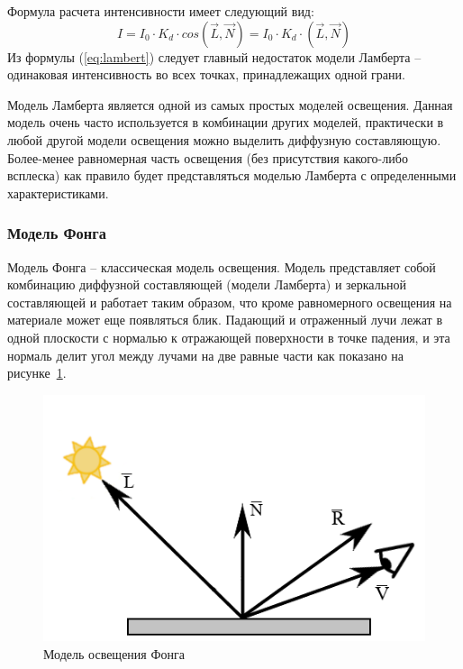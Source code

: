 Формула расчета интенсивности имеет следующий вид:
\begin{equation}
	\label{eq:lambert}
	I = I_0 \cdot K_d \cdot cos(\overrightarrow L, \overrightarrow N) = I_0 \cdot K_d \cdot (\overrightarrow L, \overrightarrow N) 
\end{equation}
Из формулы (\ref{eq:lambert}) следует главный недостаток модели Ламберта – одинаковая интенсивность во всех точках, принадлежащих одной грани.

Модель Ламберта является одной из самых простых моделей освещения. Данная модель очень часто используется в комбинации других моделей, практически в любой другой модели освещения можно выделить диффузную составляющую. Более-менее равномерная часть освещения (без присутствия какого-либо всплеска) как правило будет представляться моделью Ламберта с определенными характеристиками.

\subsubsection{Модель Фонга}

Модель Фонга – классическая модель освещения. Модель представляет собой комбинацию диффузной составляющей (модели Ламберта) и зеркальной составляющей и работает таким образом, что кроме равномерного освещения на материале может еще появляться блик.
Падающий и отраженный лучи лежат в одной плоскости с нормалью к отражающей поверхности в точке падения, и эта нормаль делит угол между лучами на две равные части как показано на рисунке~\ref{img:fong-light}.

\begin{figure}[h]
	\centering
	\includegraphics[height=0.3\textheight]{img/phong.png}
	\caption{Модель освещения Фонга}
	\label{img:fong-light}
\end{figure}

